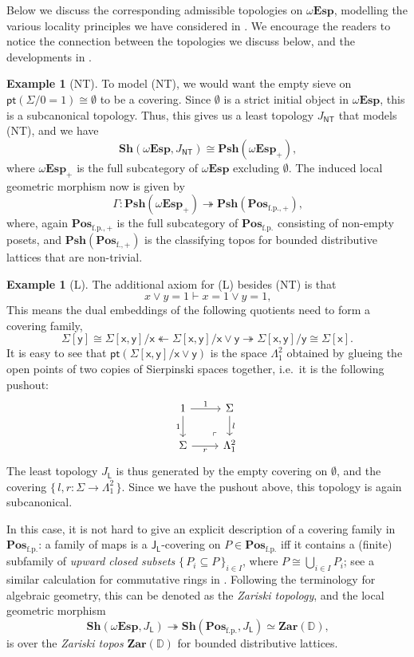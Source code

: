 \documentclass[a4paper,12pt]{amsart}
\theoremstyle{definition}
\newtheorem{example}[theorem]{Example}
\newcommand{\mb}[1]{\mathbf{#1}}
\newcommand{\mbb}[1]{\mathbb{#1}}
\newcommand{\mr}[1]{\mathrm{#1}}
\newcommand{\ms}[1]{\mathsf{#1}}
\newcommand{\Pos}{\mb{Pos}}
\newcommand{\sh}{\mb{Sh}}
\newcommand{\psh}{\mb{Psh}}
\newcommand{\set}[1]{\{\,#1\,\}}
\newcommand{\surj}{\twoheadrightarrow}
\newcommand{\fp}{_{\mr{f.p.}}}
\newcommand{\emp}{\emptyset}
\newcommand{\pt}{\ms{pt}}
\newcommand{\wTop}{\omega\mb{Esp}}
\begin{document}
Below we discuss the corresponding admissible topologies on $\wTop$, modelling the various locality principles we have considered in . We encourage the readers to notice the connection between the topologies we discuss below, and the developments in .

\begin{example}[NT]
  To model (NT), we would want the empty sieve on $\pt(\Sigma/0=1) \cong \emp$ to be a covering. Since $\emp$ is a strict initial object in $\wTop$, this is a subcanonical topology. Thus, this gives us a least topology $J_{\ms{NT}}$ that models (NT), and we have
  \[ \sh(\wTop,J_{\ms{NT}}) \cong \psh(\wTop_+)\text{,} \]
  where $\wTop_+$ is the full subcategory of $\wTop$ excluding $\emp$. The induced local geometric morphism now is given by 
  \[ \Gamma \colon \psh(\wTop_+) \surj \psh(\Pos_{\mr{f.p.,+}})\text{,} \]
  where, again $\Pos_{\mr{f.p.,+}}$ is the full subcategory of $\Pos_{\mr{f.p.}}$ consisting of non-empty posets, and $\psh(\Pos_{\mr{f.,+}})$ is the classifying topos for bounded distributive lattices that are non-trivial.
\end{example}

\begin{example}[L]
  The additional axiom for (L) besides (NT) is that 
  \[ x \vee y = 1 \vdash x = 1 \vee y = 1\text{,} \] 
  This means the dual embeddings of the following quotients need to form a covering family,
  \[ \Sigma[\ms{y}] \cong \Sigma[\ms{x},\ms{y}]/\ms{x} \twoheadleftarrow \Sigma[\ms{x},\ms{y}]/\ms{x}\vee \ms{y} \surj \Sigma[\ms{x},\ms{y}]/\ms{y} \cong \Sigma[\ms{x}]\text{.} \]
  It is easy to see that $\pt(\Sigma[\ms{x},\ms{y}]/\ms{x} \vee \ms{y})$ is the space $\Lambda^2_1$ obtained by glueing the open points of two copies of Sierpinski spaces together, i.e.\ it is the following pushout:
  \[
  \begin{tikzcd}
    1 \ar[d, "1"'] \ar[r, "1"] & \Sigma \ar[d, "l"] \\ 
    \Sigma \ar[r, "r"'] & \Lambda^2_1
    \arrow["\lrcorner"{anchor=center, pos=0.125, rotate=180}, draw=none, from=2-2, to=1-1]    
  \end{tikzcd}
  \]
  The least topology $J_{\ms L}$ is thus generated by the empty covering on $\emp$, and the covering $\set{l,r : \Sigma \to \Lambda^2_1}$. Since we have the pushout above, this topology is again subcanonical. 
  
  In this case, it is not hard to give an explicit description of a covering family in $\Pos\fp$: a family of maps is a $\ms J_{\ms L}$-covering on $P \in \Pos\fp$ iff it contains a (finite) subfamily of \emph{upward closed subsets} $\set{P_i\subseteq P}_{i\in I}$, where $P \cong \bigcup_{i\in I}P_i$; see a similar calculation for commutative rings in \citet[VIII. 6]{maclane1992sheaves}. Following the terminology for algebraic geometry, this can be denoted as the \emph{Zariski topology}, and the local geometric morphism
  \[ \sh(\wTop,J_{\ms L}) \surj \sh(\Pos\fp,J_{\ms L}) \simeq \mb{Zar}(\mbb D)\text{,} \]
  is over the \emph{Zariski topos} $\mb{Zar}(\mbb D)$ for bounded distributive lattices.
\end{example}
\end{document}

